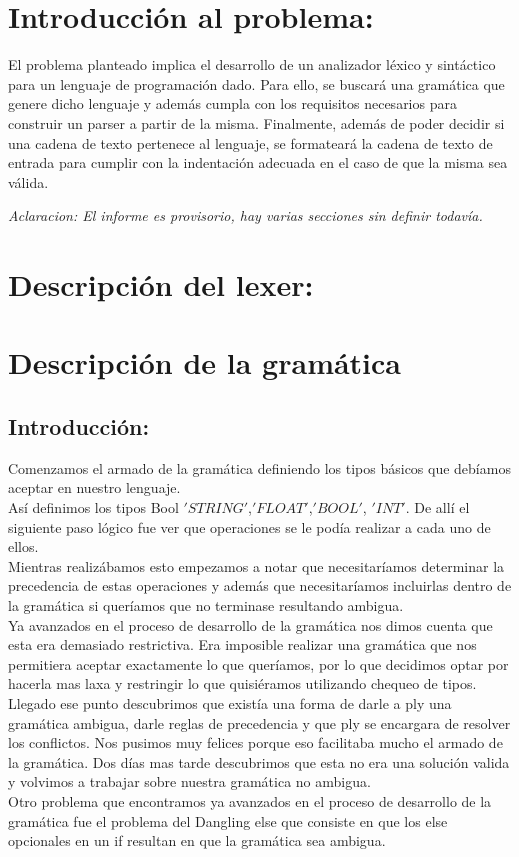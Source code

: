 \documentclass[10pt, a4paper]{article}
\begin{document}
	

\tableofcontents
\pagebreak

\section{Introducción al problema:}
El problema planteado implica el desarrollo de un analizador léxico y sintáctico para un lenguaje de programación dado. Para ello, se buscará una gramática que genere dicho lenguaje y además cumpla con los requisitos necesarios para construir un parser a partir de la misma. Finalmente, además de poder decidir si una cadena de texto pertenece al lenguaje, se formateará la cadena de texto de entrada para cumplir con la indentación adecuada en el caso de que la misma sea válida.

\textit{Aclaracion: El informe es provisorio, hay varias secciones sin definir todavía. }

\section{Descripción del lexer:}


\section{Descripción de la gramática}

\subsection{Introducción:}
Comenzamos el armado de la gramática definiendo los tipos básicos que debíamos aceptar en nuestro lenguaje.
\\
Así definimos los tipos Bool $'STRING'$,$'FLOAT'$,$'BOOL'$, $'INT'$. De allí el siguiente paso lógico fue ver que operaciones se le podía realizar a cada uno de ellos.
\\
Mientras realizábamos esto empezamos a notar que necesitaríamos determinar la precedencia de estas operaciones y además que necesitaríamos incluirlas  dentro de la gramática si queríamos que no terminase resultando ambigua.
\\
Ya avanzados en el proceso de desarrollo de la gramática nos dimos cuenta que esta era demasiado restrictiva. Era imposible realizar una gramática que nos permitiera aceptar exactamente lo que queríamos, por lo que decidimos optar por hacerla mas laxa y restringir lo que quisiéramos utilizando chequeo de tipos.
\\
Llegado ese punto descubrimos que existía una forma de darle a ply una gramática ambigua, darle reglas de precedencia y que ply se encargara de resolver los conflictos. Nos pusimos muy felices porque eso facilitaba mucho el armado de la gramática. Dos días mas tarde descubrimos que esta no era una solución valida y volvimos a trabajar sobre nuestra gramática no ambigua.
\\
Otro problema que encontramos ya avanzados en el proceso de desarrollo de la gramática fue el problema del Dangling else que consiste en que los else opcionales en un if resultan en que la gramática sea ambigua. 
\end{document}
